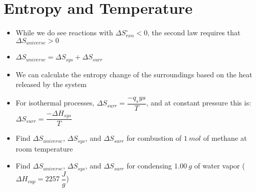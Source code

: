 \documentclass[12pt, openany, letterpaper]{memoir}
\begin{document}
\section{Entropy and Temperature}
\begin{itemize}
	\item While we do see reactions with $\Delta S^{\circ}_{rxn}<0$, the second law requires that $\Delta S_{universe}>0$
	\item $\Delta S_{universe} = \Delta S_{sys} + \Delta S_{surr}$
	\item We can calculate the entropy change of the surroundings based on the heat released by the system
	\item For isothermal processes, $\Delta S_{surr} = \dfrac{-q_sys}{T}$, and at constant pressure this is: $\Delta S_{surr} = \dfrac{-\Delta H_{sys}}{T}$
	\item Find $\Delta S_{universe}$, $\Delta S_{sys}$, and $\Delta S_{surr}$ for combustion of $1~mol$ of methane at room temperature
	\item Find $\Delta S_{universe}$, $\Delta S_{sys}$, and $\Delta S_{surr}$ for condensing $1.00~g$ of water vapor ($\Delta H_{vap}=2257~\dfrac{J}{g}$)
\end{itemize}
\end{document}
